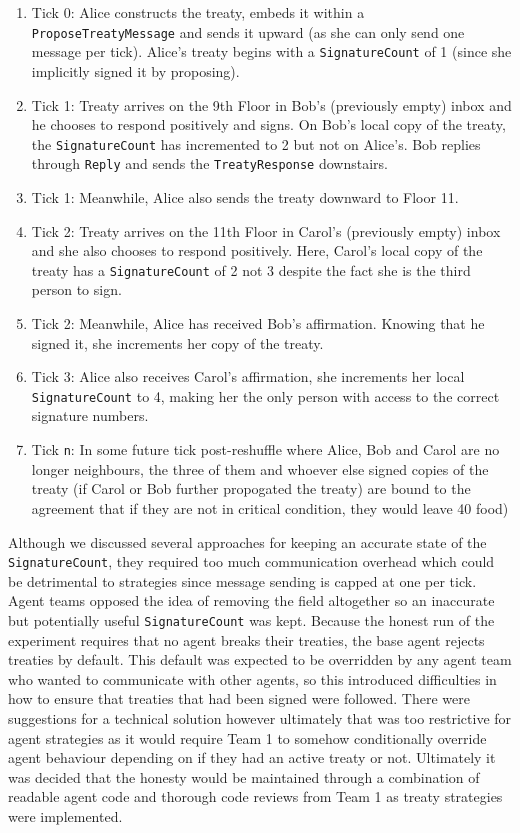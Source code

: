 \begin{enumerate}
    \item Tick 0: Alice constructs the treaty, embeds it within a \texttt{ProposeTreatyMessage} and sends it upward (as she can only send one message per tick). Alice's treaty begins with a \texttt{SignatureCount} of 1 (since she implicitly signed it by proposing).
    \item Tick 1: Treaty arrives on the 9th Floor in Bob's (previously empty) inbox and he chooses to respond positively and signs. On Bob's local copy of the treaty, the \texttt{SignatureCount} has incremented to 2 but not on Alice's. Bob replies through \texttt{Reply} and sends the  \texttt{TreatyResponse} downstairs.
    \item Tick 1: Meanwhile, Alice also sends the treaty downward to Floor 11.
    \item Tick 2: Treaty arrives on the 11th Floor in Carol's (previously empty) inbox and she also chooses to respond positively. \newline
    Here, Carol's local copy of the treaty has a \texttt{SignatureCount} of 2 not 3 despite the fact she is the third person to sign.
    \item Tick 2: Meanwhile, Alice has received Bob's affirmation. Knowing that he signed it, she increments her copy of the treaty.
    \item Tick 3: Alice also receives Carol's affirmation, she increments her local \texttt{SignatureCount} to 4, making her the only person with access to the correct signature numbers.
    \item Tick \texttt{n}: In some future tick post-reshuffle where Alice, Bob and Carol are no longer neighbours, the three of them and whoever else signed copies of the treaty (if Carol or Bob further propogated the treaty) are bound to the agreement that if they are not in critical condition, they would leave 40 food)
\end{enumerate}
Although we discussed several approaches for keeping an accurate state of the \texttt{SignatureCount}, they required too much communication overhead which could be detrimental to strategies since message sending is capped at one per tick. Agent teams opposed the idea of removing the field altogether so an inaccurate but potentially useful \texttt{SignatureCount} was kept. \newline
Because the honest run of the experiment requires that no agent breaks their treaties, the base agent rejects treaties by default. This default was expected to be overridden by any agent team who wanted to communicate with other agents, so this introduced difficulties in how to ensure that treaties that had been signed were followed. There were suggestions for a technical solution however ultimately that was too restrictive for agent strategies as it would require Team 1 to somehow conditionally override agent behaviour depending on if they had an active treaty or not. Ultimately it was decided that the honesty would be maintained through a combination of readable agent code and thorough code reviews from Team 1 as treaty strategies were implemented. \newline
